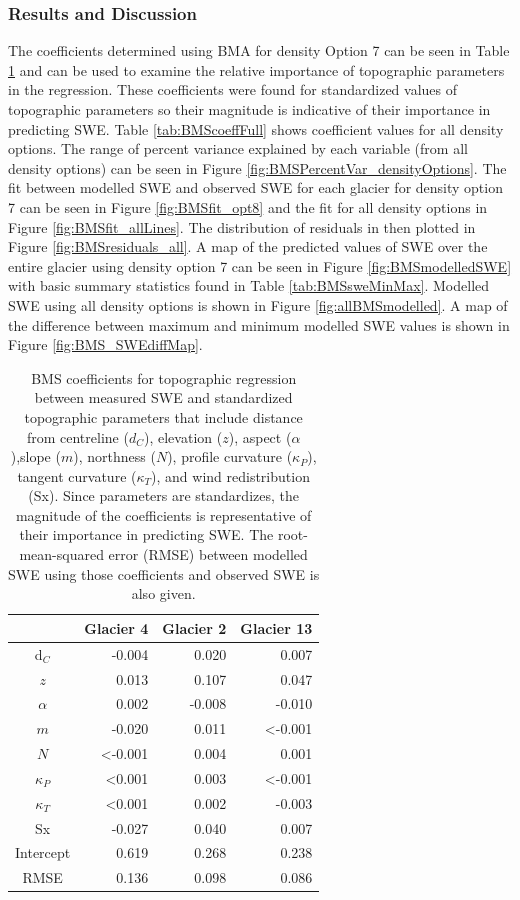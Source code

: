 \documentclass[12pt]{article}
\begin{document}
\subsubsection{Results and Discussion}

The coefficients determined using BMA for density Option 7 can be seen in Table \ref{tab:BMScoeff} and can be used to examine the relative importance of topographic parameters in the regression. These coefficients were found for standardized values of topographic parameters so their magnitude is indicative of their importance in predicting SWE. Table \ref{tab:BMScoeffFull} shows coefficient values for all density options. The range of percent variance explained by each variable (from all density options) can be seen in Figure \ref{fig:BMSPercentVar_densityOptions}. The fit between modelled SWE and observed SWE for each glacier for density option 7 can be seen in Figure \ref{fig:BMSfit_opt8} and the fit for all density options in Figure \ref{fig:BMSfit_allLines}. The distribution of residuals in then plotted in Figure \ref{fig:BMSresiduals_all}. A map of the predicted values of SWE over the entire glacier using density option 7 can be seen in Figure \ref{fig:BMSmodelledSWE} with basic summary statistics found in Table \ref{tab:BMSsweMinMax}. Modelled SWE using all density options is shown in Figure \ref{fig:allBMSmodelled}. A map of the difference between maximum and minimum modelled SWE values is shown in Figure \ref{fig:BMS_SWEdiffMap}.

\begin{table}
\centering
\caption{BMS coefficients for topographic regression between measured SWE and standardized topographic parameters that include distance from centreline ($d_C$), elevation ($z$), aspect ($\alpha$),slope ($m$), northness ($N$), profile curvature ($\kappa_P$), tangent curvature ($\kappa_T$), and wind redistribution (Sx). Since parameters are standardizes, the magnitude of the coefficients is representative of their importance in predicting SWE. The root-mean-squared error (RMSE) between modelled SWE using those coefficients and observed SWE is also given.}
\label{tab:BMScoeff}
\begin{tabular}{crrr}
 & \textbf{Glacier 4} & \textbf{Glacier 2} & \textbf{Glacier 13} \\ \hline
d$_C$ 			& -0.004 					& 0.020 	& 0.007 \\
$z$ 				&  0.013 					& 0.107 	& 0.047 \\
$\alpha$ 		& 0.002 					& -0.008 	& -0.010 \\
$m$ 			& -0.020 					& 0.011 	&  \textless-0.001 \\
$N$ 				&   \textless-0.001 	& 0.004 	& 0.001 \\
$\kappa_P$ 	&  \textless0.001 	& 0.003 	&\textless -0.001 \\
$\kappa_T$ 	& \textless0.001 		& 0.002 	& -0.003 \\
Sx 			& -0.027 					& 0.040 	& 0.007 \\
Intercept 		& 0.619 					& 0.268 	& 0.238 \\ \hline
RMSE 			& 0.136 					& 0.098	& 0.086 
\end{tabular}
\end{table}
\end{document}
